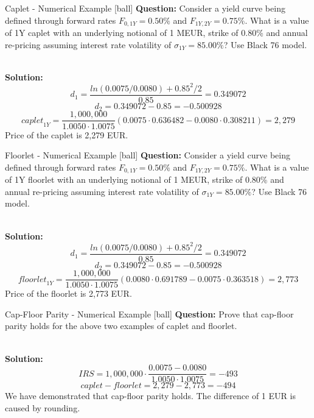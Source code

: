 \documentclass{beamer}
\begin{document}
\begin{frame}{Caplet - Numerical Example}
[ball]
\textbf{Question:}
Consider a yield curve being defined through forward rates $F_{0, 1Y} = 0.50\%$ and $F_{1Y, 2Y} = 0.75\%$. What is a value of 1Y caplet with an underlying notional of 1 MEUR, strike of 0.80\% and annual re-pricing assuming interest rate volatility of $\sigma_{1Y} = 85.00\%$? Use Black 76 model.

\mbox{}\\
\textbf{Solution:}
\begin{equation}
d_1 = \frac{ln(0.0075 / 0.0080) + 0.85^2 / 2}{0.85} = 0.349072
\end{equation}
\begin{equation}
d_2 = 0.349072 - 0.85 = -0.500928
\end{equation}
\begin{equation}
\textit{caplet}_{1Y} = \frac{1,000,000}{1.0050 \cdot 1.0075}(0.0075 \cdot 0.636482 - 0.0080 \cdot 0.308211) = 2,279
\end{equation}
Price of the caplet is 2,279 EUR.
\end{frame}

\begin{frame}{Floorlet - Numerical Example}
[ball]
\textbf{Question:}
Consider a yield curve being defined through forward rates $F_{0, 1Y} = 0.50\%$ and $F_{1Y, 2Y} = 0.75\%$. What is a value of 1Y floorlet with an underlying notional of 1 MEUR, strike of 0.80\% and annual re-pricing assuming interest rate volatility of $\sigma_{1Y} = 85.00\%$? Use Black 76 model.

\mbox{}\\
\textbf{Solution:}
\begin{equation}
d_1 = \frac{ln(0.0075 / 0.0080) + 0.85^2 / 2}{0.85} = 0.349072
\end{equation}
\begin{equation}
d_2 = 0.349072 - 0.85 = -0.500928
\end{equation}
\begin{equation}
\textit{floorlet}_{1Y} = \frac{1,000,000}{1.0050 \cdot 1.0075}(0.0080 \cdot 0.691789 - 0.0075 \cdot 0.363518) = 2,773
\end{equation}
Price of the floorlet is 2,773 EUR.
\end{frame}

\begin{frame}{Cap-Floor Parity - Numerical Example}
[ball]
\textbf{Question:}
Prove that cap-floor parity holds for the above two examples of caplet and floorlet.

\mbox{}\\
\textbf{Solution:}
\begin{equation}
IRS = 1,000,000 \cdot \frac{0.0075 - 0.0080}{1.0050 \cdot 1.0075} = -493
\end{equation}
\begin{equation}
caplet - floorlet = 2,279 - 2,773 = -494
\end{equation}
We have demonstrated that cap-floor parity holds. The difference of 1 EUR is caused by rounding.
\end{frame}
\end{document}
